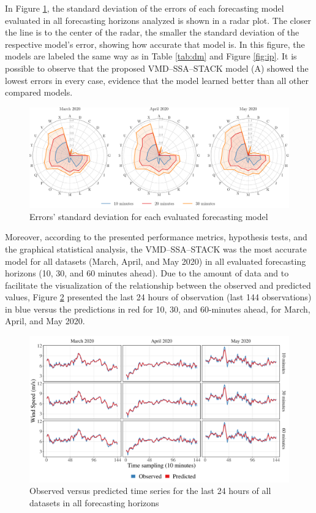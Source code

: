 In Figure \ref{fig:radarplot}, the standard deviation of the errors of each forecasting model evaluated in all forecasting horizons analyzed is shown in a radar plot. The closer the line is to the center of the radar, the smaller the standard deviation of the respective model's error, showing how accurate that model is. In this figure, the models are labeled the same way as in Table \ref{tab:dm} and Figure \ref{fig:ip}. It is possible to observe that the proposed \ac{VMD}--\ac{SSA}--\ac{STACK} model (A) showed the lowest errors in every case, evidence that the model learned better than all other compared models.

\begin{figure}[htb!]
    \centering
    \includegraphics[width=\linewidth]{Media/cs3_radarplot.pdf}
    \caption{Errors' standard deviation for each evaluated forecasting model}
    \label{fig:radarplot}
\end{figure}

Moreover, according to the presented performance metrics, hypothesis tests, and the graphical statistical analysis, the \ac{VMD}--\ac{SSA}--\ac{STACK} was the most accurate model for all datasets (March, April, and May 2020) in all evaluated forecasting horizons (10, 30, and 60 minutes ahead). Due to the amount of data and to facilitate the visualization of the relationship between the observed and predicted values, Figure \ref{fig:po} presented the last 24 hours of observation (last 144 observations) in blue versus the predictions in red for 10, 30, and 60-minutes ahead, for March, April, and May 2020.

\begin{figure}[htb!]
    \centering
    \includegraphics[width=\linewidth]{Media/cs3_PO.pdf}
    \caption{Observed versus predicted time series for the last 24 hours of all datasets in all forecasting horizons}
    \label{fig:po}
\end{figure}

